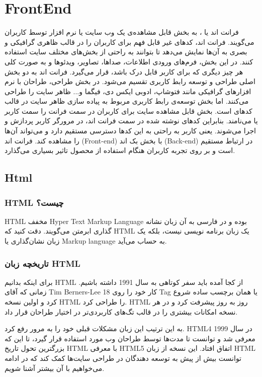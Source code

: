\section{FrontEnd}
فرانت اند یا
، به بخش قابل مشاهده‌ی یک وب سایت یا نرم افزار توسط کاربران می‌گویند. فرانت اند، کدهای غیر قابل فهم برای کاربران را در قالب ظاهری گرافیکی و بصری به آن‌ها نمایش می‌دهد تا بتوانند به راحتی از بخش‌های مختلف سایت استفاده کنند. در این بخش، فرم‌های ورودی اطلاعات، صداها، تصاویر، ویدئوها و به صورت کلی هر چیز دیگری که برای کاربر قابل درک باشد، قرار می‌گیرد.
فرانت اند به دو بخش اصلی طراحی و توسعه رابط کاربری تقسیم می‌شود. در بخش طراحی، طراحان با نرم افزارهای گرافیکی مانند فتوشاپ، ادوبی ایکس دی، فیگما و... ظاهر سایت را طراحی می‌کنند. اما بخش توسعه‌ی رابط کاربری مربوط به پیاده سازی ظاهر سایت در قالب کدهای
است. بخش قابل مشاهده‌ سایت برای کاربران در سمت فرانت را سمت کاربر یا
 می‌نامند. بنابراین کدهای نوشته شده در سمت فرانت اند، در مرورگر کاربر پردازش و اجرا می‌شوند. یعنی کاربر به راحتی به این کدها دسترسی مستقیم دارد و می‌تواند آن‌ها را مشاهده کند. فرانت اند (Front-end) با بخش بک اند (Back-end) در ارتباط مستقیم است و بر روی تجربه کاربران هنگام استفاده از محصول تاثیر بسیاری می‌گذارد.

\subsection{Html}
\subsubsection{HTML چیست؟}
HTML مخفف Hyper Text Markup Language بوده و در فارسی به آن زبان نشانه‌ گذاری ابرمتن می‌گویند. دقت کنید که HTML یک زبان برنامه نویسی نیست، بلکه یک زبان نشان‌گذاری یا Markup language به حساب می‌آید.

\subsubsection{تاریخچه زبان HTML}
برای اینکه بدانیم HTML از کجا آمده باید سفر کوتاهی به سال 1991 داشته باشیم. زمانی که آقای Tim Berners-Lee کار خود را روی 18 Tag یا همان برچسب ساده شروع کرد و اولین نسخه HTML را طراحی کرد. HTML روز به روز پیشرفت کرد و در هر نسخه امکانات بیشتری را در قالب تگ‌‌های کاربردی‌تر در اختیار طراحان قرار داد.

به این ترتیب این زبان مشکلات قبلی خود را به مرور رفع کرد. HTML4 در سال 1999 معرفی شد و توانست تا مدت‌ها توسط طراحان وب مورد استفاده قرار گیرد، تا این که بزرگترین تحول تاریخ HTML با معرفی HTML5 اتفاق افتاد. این نسخه از زبان HTML توانست بیش از پیش به توسعه دهندگان در طراحی سایت‌ها کمک کند که در ادامه می‌خواهیم با آن بیشتر آشنا شویم.


